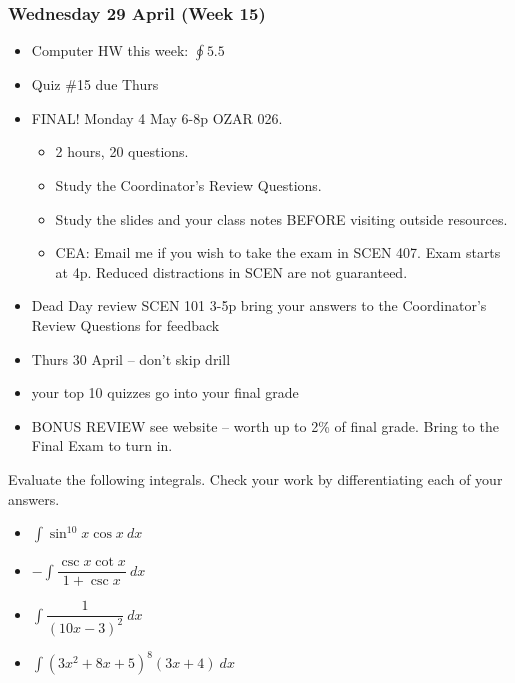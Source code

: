 \documentclass[14pt]{beamer}
\newcommand{\dint}{\displaystyle\int}
\begin{document}

\begin{frame}
\frametitle{Wednesday 29 April (Week 15)}
\small
\begin{itemize}
\item Computer HW this week: $\oint 5.5$
\item Quiz \#15 due Thurs
\item FINAL! Monday 4 May 6-8p OZAR 026. 
	\begin{itemize}\footnotesize
	\item 2 hours, 20 questions.
	\item Study the Coordinator's Review Questions.
	\item Study the slides and your class notes BEFORE visiting outside resources.
	\item CEA: Email me if you wish to take the exam in SCEN 407.   Exam starts at 4p.  Reduced distractions in SCEN are not guaranteed.   
	\end{itemize}
\end{itemize}
\end{frame}

\begin{frame}
\small
\begin{itemize}	
\item Dead Day review SCEN 101 3-5p bring your answers to the Coordinator's Review Questions for feedback
\item Thurs 30 April -- don't skip drill
\item your top 10 quizzes go into your final grade
\item BONUS REVIEW see website -- worth up to 2\% of final grade.  Bring to the Final Exam to turn in.
\end{itemize}
\end{frame}

\begin{frame}%
\small
\begin{exe} Evaluate the following integrals.  Check your work by differentiating each of your answers.
\begin{itemize}
\item $\dint \sin^{10} x \cos x \ dx$
\item $-\dint \dfrac{\csc x \cot x}{1+\csc x}\ dx$
\item $\dint \dfrac{1}{(10x-3)^2}\ dx$
\item $\dint (3x^2 + 8x + 5)^8 (3x+4)\ dx$
\end{itemize}
\end{exe}
\end{frame}
\end{document}
